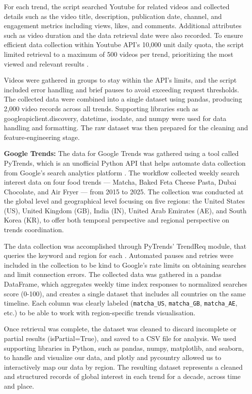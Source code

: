 \documentclass{article}
\begin{document}
For each trend, the script searched Youtube for related videos and collected details such as the video title, description, publication date, channel, and engagement metrics including views, likes, and comments. Additional attributes such as video duration and the data retrieval date were also recorded. To ensure efficient data collection within Youtube API's 10,000 unit daily quota, the script limited retrieval to a maximum of 500 videos per trend, prioritizing the most viewed and relevant results \citep{youtube_api}. 

Videos were gathered in groups to stay within the API's limits, and the script included error handling and brief pauses to avoid exceeding request thresholds. The collected data were combined into a single dataset using pandas, producing 2,000 video records across all trends. Supporting libraries such as googleapiclient.discovery, datetime, isodate, and numpy were used for data handling and formatting. The raw dataset was then prepared for the cleaning and feature-engineering stage. 

\textbf{Google Trends: }The data for Google Trends was gathered using a tool called PyTrends, which is an unofficial Python API that helps automate data collection from Google’s search analytics platform \citep{pytrends_api}. The workflow collected weekly search interest data on four food trends — Matcha, Baked Feta Cheese Pasta, Dubai Chocolate, and Air Fryer — from 2015 to 2025. The collection was conducted at the global level and geographical level focusing on five regions: the United States (US), United Kingdom (GB), India (IN), United Arab Emirates (AE), and South Korea (KR), to offer both temporal perspective and regional perspective on trends coordination.

The data collection was accomplished through PyTrends’ TrendReq module, that queries the keyword and region for each \citep{pytrends_api}. Automated pauses and retries were included in the collection to be kind to Google’s rate limits on obtaining searches and limit connection errors. The collected data was gathered in a pandas DataFrame, which aggregates weekly time index responses to normalized searches score (0-100), and creates a single dataset that includes all countries on the same timeline. Each column was clearly labeled (\texttt{matcha\_US}, \texttt{matcha\_GB}, \texttt{matcha\_AE}, etc.) to be able to work with region-specific trends visualisation.

Once retrieval was complete, the dataset was cleaned to discard incomplete or partial results (isPartial=True), and saved to a CSV file for analysis. We used supporting libraries in Python, such as pandas, numpy, matplotlib, and seaborn, to handle and visualize our data, and plotly and pycountry allowed us to interactively map our data by region. The resulting dataset represents a cleaned and structured records of global interest in each trend for a decade, across time and place.
\end{document}
